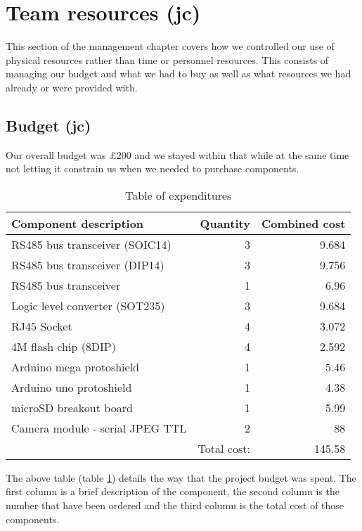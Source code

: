 \section{Team resources (jc)}
\label{team_resources}

This section of the management chapter covers how we controlled our use of physical resources rather than time or personnel resources. This consists of managing our budget and what we had to buy as well as what resources we had already or were provided with.

\subsection{Budget (jc)}

Our overall budget was \pounds 200 and we stayed within that while at the same time not letting it constrain us when we needed to purchase components.

\begin{table}[H]
\begin{tabular}{| l | r || r |}
\hline
\textbf{Component description} & \textbf{Quantity} & \textbf{Combined cost} \\ \hline \hline
RS485 bus transceiver (SOIC14) & 3 & 9.684 \\ \hline
RS485 bus transceiver (DIP14) & 3 & 9.756 \\ \hline
RS485 bus transceiver & 1 & 6.96 \\ \hline
Logic level converter (SOT235) & 3 & 9.684 \\ \hline
RJ45 Socket & 4 & 3.072 \\ \hline
4M flash chip (8DIP) & 4 & 2.592 \\ \hline
Arduino mega protoshield & 1 & 5.46 \\ \hline
Arduino uno protoshield & 1 & 4.38 \\ \hline
microSD breakout board & 1 & 5.99 \\ \hline
Camera module - serial JPEG TTL & 2 & 88 \\ \hline \hline
 & Total cost: & 145.58 \\ \hline
\end{tabular}
\caption{Table of expenditures}
\label{expenditure}
\end{table}

The above table (table \ref{expenditure}) details the way that the project budget was spent. The first column is a brief description of the component, the second column is the number that have been ordered and the third column is the total cost of those components.

